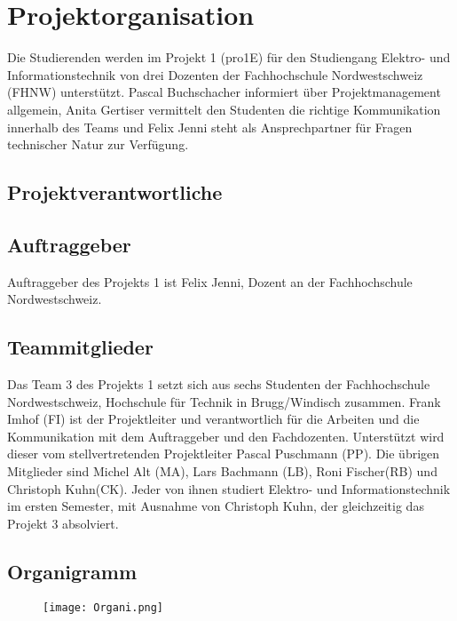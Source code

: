 \section{Projektorganisation}

Die Studierenden werden im Projekt 1 (pro1E) für den Studiengang Elektro- und Informationstechnik von drei Dozenten der Fachhochschule Nordwestschweiz (FHNW) unterstützt. Pascal Buchschacher informiert über Projektmanagement allgemein, Anita Gertiser vermittelt den Studenten die richtige Kommunikation innerhalb des Teams und Felix Jenni steht als Ansprechpartner für Fragen technischer Natur zur Verfügung.
\subsection{Projektverantwortliche}

\subsection{Auftraggeber}
Auftraggeber des Projekts 1 ist Felix Jenni, Dozent an der Fachhochschule Nordwestschweiz.

\subsection{Teammitglieder}
Das Team 3 des Projekts 1 setzt sich aus sechs Studenten der Fachhochschule Nordwestschweiz, Hochschule für Technik in Brugg/Windisch zusammen. Frank Imhof (FI) ist der Projektleiter und verantwortlich für die Arbeiten und die Kommunikation mit dem Auftraggeber und den Fachdozenten. Unterstützt wird dieser vom stellvertretenden Projektleiter \newline Pascal Puschmann (PP). Die übrigen Mitglieder sind Michel Alt (MA), Lars Bachmann (LB), Roni Fischer(RB) und Christoph Kuhn(CK). Jeder von ihnen studiert Elektro- und Informationstechnik im ersten Semester, mit Ausnahme von Christoph Kuhn, der gleichzeitig das Projekt 3 absolviert.

\subsection{Organigramm}
\begin{figure}[H]
	\centering
	\texttt{[image: Organi.png]}
	\label{fig:Organigramm}
\end{figure}
